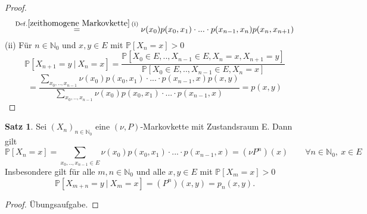 \documentclass[a4paper,12pt]{scrartcl}
\theoremstyle{definition}
\newtheorem{sat}{Satz}[section]
\begin{document}
\begin{proof}
\begin{equation*}
\stackrel{\mathrm{Def.}\ref{zeithomogene Markovkette} \: \mathrm{(i)}}{=} \nu(x_{0}) p(x_{0},x_{1}) \cdot ...\cdot p(x_{n-1},x_{n})p(x_{n},x_{n+1})
\end{equation*}
(ii) Für $n \in \mathbb{N}_{0}$ und $x,y \in E$ mit $\mathbb{P}[X_{n} = x]>0$
\begin{equation*}
\mathbb{P}[X_{n+1} = y \: | \: X_{n} = x] = \dfrac{\mathbb{P}[X_{0} \in E,.., X_{n-1} \in E, X_{n} = x, X_{n+1} = y]}{\mathbb{P}[X_{0} \in E,.., X_{n-1} \in E, X_{n} = x]}
\end{equation*}
\begin{equation*}
= \dfrac{\sum_{x_{0},..,x_{n-1}} \nu(x_{0}) p(x_{0},x_{1}) \cdot ...\cdot p(x_{n-1},x)p(x,y)}{\sum_{x_{0},..,x_{n-1}} \nu(x_{0}) p(x_{0},x_{1}) \cdot ...\cdot p(x_{n-1},x)} = p(x,y)
\end{equation*}
\end{proof}
\begin{sat}
\label{"Satz 1.8"}
Sei ${(X_{n})}_{n \in \mathbb{N}_{0}}$ eine $(\nu,P)$-Markovkette mit Zustandsraum E. Dann gilt
\begin{equation*}
\mathbb{P}[X_{n} = x] = \sum_{x_{0},..,x_{n-1} \in E} \nu(x_{0}) p(x_{0},x_{1}) \cdot ...\cdot p(x_{n-1},x) = (\nu P^{n})(x) \qquad \forall n \in \mathbb{N}_{0}, \: x \in E
\end{equation*}
Insbesondere gilt für alle $m,n \in \mathbb{N}_{0}$ und alle $x,y \in E$ mit $\mathbb{P}[X_{m} = x]>0$
\begin{equation*}
\mathbb{P}[X_{m+n}=y \: | \: X_{m} = x] = (P^{n})(x,y) = p_{n}(x,y).
\end{equation*}
\end{sat}
\begin{proof}
Übungsaufgabe.
\end{proof}
\end{document}

